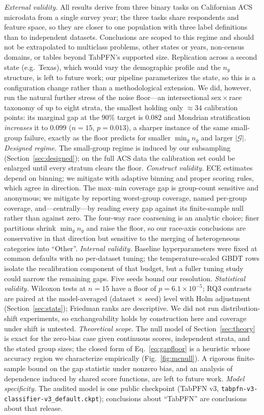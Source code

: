 \documentclass[review,12pt]{elsarticle}
\begin{document}
\emph{External validity.} All results derive from three binary tasks on Californian ACS microdata from a single survey year; the three tasks share respondents and feature space, so they are closer to one population with three label definitions than to independent datasets. Conclusions are scoped to this regime and should not be extrapolated to multiclass problems, other states or years, non-census domains, or tables beyond TabPFN's supported size. Replication across a second state (e.g.\ Texas), which would vary the demographic profile and the $n_g$ structure, is left to future work; our pipeline parameterizes the state, so this is a configuration change rather than a methodological extension. We did, however, run the natural further stress of the noise floor---an intersectional sex\,$\times$\,race taxonomy of up to eight strata, the smallest holding only $\approx\!34$ calibration points: its marginal gap at the $90\%$ target is $0.082$ and Mondrian stratification \emph{increases} it to $0.099$ ($n=15$, $p=0.013$), a sharper instance of the same small-group failure, exactly as the floor predicts for smaller $\min_g n_g$ and larger $|\mathcal{G}|$. \emph{Designed regime.} The small-group regime is induced by our subsampling (Section~\ref{sec:designed}); on the full ACS data the calibration set could be enlarged until every stratum clears the floor. \emph{Construct validity.} ECE estimates depend on binning; we mitigate with adaptive binning and proper scoring rules, which agree in direction. The max--min coverage gap is group-count sensitive and anonymous; we mitigate by reporting worst-group coverage, named per-group coverage, and---centrally---by reading every gap against its finite-sample null rather than against zero. The four-way race coarsening is an analytic choice; finer partitions shrink $\min_g n_g$ and raise the floor, so our race-axis conclusions are conservative in that direction but sensitive to the merging of heterogeneous categories into ``Other''. \emph{Internal validity.} Baseline hyperparameters were fixed at common defaults with no per-dataset tuning; the temperature-scaled GBDT rows isolate the recalibration component of that budget, but a fuller tuning study could narrow the remaining gaps. Five seeds bound our resolution. \emph{Statistical validity.} Wilcoxon tests at $n=15$ have a floor of $p=6.1\times10^{-5}$; RQ3 contrasts are paired at the model-averaged (dataset $\times$ seed) level with Holm adjustment (Section~\ref{sec:stats}); Friedman ranks are descriptive. We did not run distribution-shift experiments, so exchangeability holds by construction here and coverage under shift is untested. \emph{Theoretical scope.} The null model of Section~\ref{sec:theory} is exact for the zero-bias case given continuous scores, independent strata, and the stated group sizes; the closed form of Eq.~\eqref{eq:gapfloor} is a heuristic whose accuracy region we characterize empirically (Fig.~\ref{fig:mcnull}). A rigorous finite-sample bound on the gap statistic under nonzero bias, and an analysis of dependence induced by shared score functions, are left to future work. \emph{Model specificity.} The audited model is one public checkpoint (TabPFN v3, \texttt{tabpfn-v3-classifier-v3\_default.ckpt}); conclusions about ``TabPFN'' are conclusions about that release. 
\end{document}
